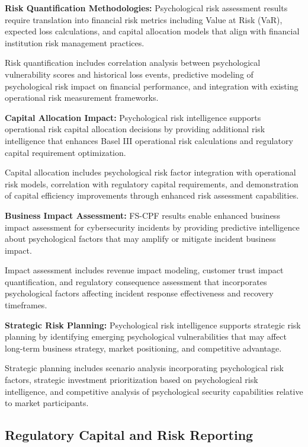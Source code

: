\documentclass[10pt, twocolumn]{article}
\begin{document}
\textbf{Risk Quantification Methodologies:} Psychological risk assessment results require translation into financial risk metrics including Value at Risk (VaR), expected loss calculations, and capital allocation models that align with financial institution risk management practices.

Risk quantification includes correlation analysis between psychological vulnerability scores and historical loss events, predictive modeling of psychological risk impact on financial performance, and integration with existing operational risk measurement frameworks.

\textbf{Capital Allocation Impact:} Psychological risk intelligence supports operational risk capital allocation decisions by providing additional risk intelligence that enhances Basel III operational risk calculations and regulatory capital requirement optimization.

Capital allocation includes psychological risk factor integration with operational risk models, correlation with regulatory capital requirements, and demonstration of capital efficiency improvements through enhanced risk assessment capabilities.

\textbf{Business Impact Assessment:} FS-CPF results enable enhanced business impact assessment for cybersecurity incidents by providing predictive intelligence about psychological factors that may amplify or mitigate incident business impact.

Impact assessment includes revenue impact modeling, customer trust impact quantification, and regulatory consequence assessment that incorporates psychological factors affecting incident response effectiveness and recovery timeframes.

\textbf{Strategic Risk Planning:} Psychological risk intelligence supports strategic risk planning by identifying emerging psychological vulnerabilities that may affect long-term business strategy, market positioning, and competitive advantage.

Strategic planning includes scenario analysis incorporating psychological risk factors, strategic investment prioritization based on psychological risk intelligence, and competitive analysis of psychological security capabilities relative to market participants.

\subsection{Regulatory Capital and Risk Reporting}
\end{document}
